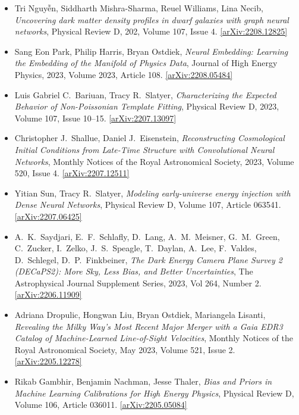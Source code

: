 \begin{itemize}
\item Tri Nguyễn, Siddharth Mishra-Sharma, Reuel Williams, Lina Necib, \textit{Uncovering dark matter density profiles in dwarf galaxies with graph neural networks}, Physical Review D, 202, Volume 107, Issue 4. \href{https://arxiv.org/abs/2208.12825}{[arXiv:2208.12825]} 
\item Sang Eon Park, Philip Harris, Bryan Ostdiek, \textit{Neural Embedding: Learning the Embedding of the Manifold of Physics Data}, Journal of High Energy Physics, 2023, Volume 2023, Article 108. \href{https://arxiv.org/abs/2208.05484}{[arXiv:2208.05484]} 
\item Luis Gabriel C.\  Bariuan, Tracy R.\  Slatyer, \textit{Characterizing the Expected Behavior of Non-Poissonian Template Fitting}, Physical Review D, 2023, Volume 107, Issue 10–15. \href{https://arxiv.org/abs/2207.13097}{[arXiv:2207.13097]} 
\item Christopher J.\  Shallue, Daniel J.\  Eisenstein, \textit{Reconstructing Cosmological Initial Conditions from Late-Time Structure with Convolutional Neural Networks}, Monthly Notices of the Royal Astronomical Society, 2023, Volume 520, Issue 4. \href{https://arxiv.org/abs/2207.12511}{[arXiv:2207.12511]} 
\item Yitian Sun, Tracy R.\  Slatyer, \textit{Modeling early-universe energy injection with Dense Neural Networks}, Physical Review D, Volume 107, Article 063541. \href{https://arxiv.org/abs/2207.06425}{[arXiv:2207.06425]} 
\item A.\  K.\  Saydjari, E.\  F.\  Schlafly, D.\  Lang, A.\  M.\  Meisner, G.\  M.\  Green, C.\  Zucker, I.\  Zelko, J.\  S.\  Speagle, T.\  Daylan, A.\  Lee, F.\  Valdes, D.\  Schlegel, D.\  P.\  Finkbeiner, \textit{The Dark Energy Camera Plane Survey 2 (DECaPS2): More Sky, Less Bias, and Better Uncertainties}, The Astrophysical Journal Supplement Series, 2023, Vol 264, Number 2. \href{https://arxiv.org/abs/2206.11909}{[arXiv:2206.11909]} 
\item Adriana Dropulic, Hongwan Liu, Bryan Ostdiek, Mariangela Lisanti, \textit{Revealing the Milky Way's Most Recent Major Merger with a Gaia EDR3 Catalog of Machine-Learned Line-of-Sight Velocities}, Monthly Notices of the Royal Astronomical Society, May 2023, Volume 521, Issue 2. \href{https://arxiv.org/abs/2205.12278}{[arXiv:2205.12278]} 
\item Rikab Gambhir, Benjamin Nachman, Jesse Thaler, \textit{Bias and Priors in Machine Learning Calibrations for High Energy Physics}, Physical Review D, Volume 106, Article 036011. \href{https://arxiv.org/abs/2205.05084}{[arXiv:2205.05084]} 

\end{itemize}
